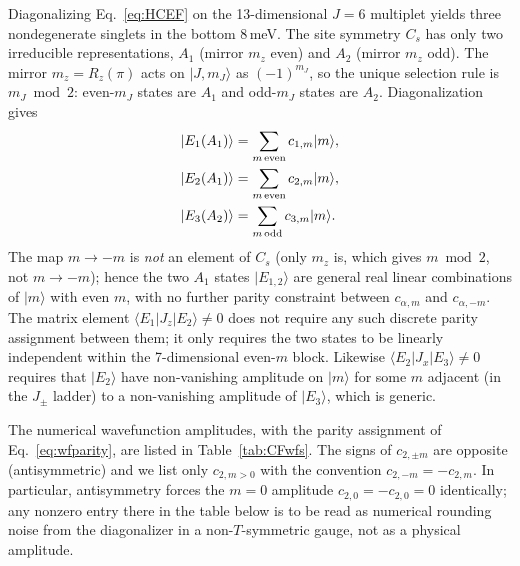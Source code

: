\documentclass[reprint,amsmath,amssymb,aps,prb,longbibliography]{revtex4-2}
\newcommand{\fix}[1]{#1}
\begin{document}
Diagonalizing Eq.~\eqref{eq:HCEF} on the 13-dimensional $J=6$ multiplet
yields three nondegenerate singlets in the bottom 8\,meV. The site
symmetry $C_s$ has only two irreducible representations, $A_1$ (mirror
$m_z$ even) and $A_2$ (mirror $m_z$ odd). The mirror $m_z =
R_z(\pi)$ acts on $|J,m_J\rangle$ as $(-1)^{m_J}$, so the unique
selection rule is $m_J \bmod 2$: even-$m_J$ states are $A_1$ and
odd-$m_J$ states are $A_2$. Diagonalization gives
\begin{equation}
\begin{aligned}
|E_1(A_1)\rangle &= \sum_{m\,{\rm even}} c_{1,m}|m\rangle,\\
|E_2(A_1)\rangle &= \sum_{m\,{\rm even}} c_{2,m}|m\rangle,\\
|E_3(A_2)\rangle &= \sum_{m\,{\rm odd}} c_{3,m}|m\rangle.
\end{aligned}
\label{eq:wfparity}
\end{equation}
The map $m\to-m$ is \emph{not} an element of
$C_s$ (only $m_z$ is, which gives $m\bmod 2$, not $m\to-m$); hence
the two $A_1$ states $|E_{1,2}\rangle$ are general real linear
combinations of $|m\rangle$ with even $m$, with no further parity
constraint between $c_{\alpha,m}$ and $c_{\alpha,-m}$. The matrix
element $\langle E_1|J_z|E_2\rangle\neq 0$ does not require any such
discrete parity assignment between them; it only requires the two
states to be linearly independent within the 7-dimensional even-$m$
block. Likewise $\langle E_2|J_x|E_3\rangle\neq 0$ requires that
$|E_2\rangle$ have non-vanishing amplitude on $|m\rangle$ for some $m$
adjacent (in the $J_\pm$ ladder) to a non-vanishing amplitude of
$|E_3\rangle$, which is generic.

The numerical wavefunction amplitudes, with the parity assignment of
Eq.~\eqref{eq:wfparity}, are listed in Table~\ref{tab:CFwfs}. The signs
of $c_{2,\pm m}$ are opposite (antisymmetric) and we list only $c_{2,m>0}$
with the convention $c_{2,-m}=-c_{2,m}$. \fix{In particular, antisymmetry
forces the $m=0$ amplitude $c_{2,0}=-c_{2,0}=0$ identically; any
nonzero entry there in the table below is to be read as numerical
rounding noise from the diagonalizer in a non-$T$-symmetric gauge, not
as a physical amplitude.}
\end{document}
